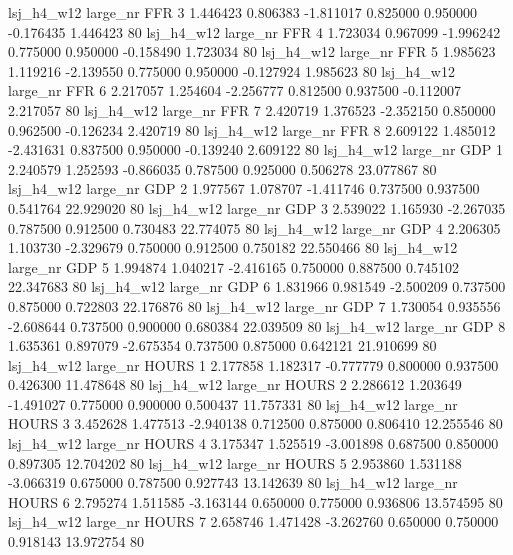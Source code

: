   lsj_h4_w12   large_nr      FFR                 3  1.446423  0.806383  -1.811017 0.825000 0.950000 -0.176435    1.446423 80
  lsj_h4_w12   large_nr      FFR                 4  1.723034  0.967099  -1.996242 0.775000 0.950000 -0.158490    1.723034 80
  lsj_h4_w12   large_nr      FFR                 5  1.985623  1.119216  -2.139550 0.775000 0.950000 -0.127924    1.985623 80
  lsj_h4_w12   large_nr      FFR                 6  2.217057  1.254604  -2.256777 0.812500 0.937500 -0.112007    2.217057 80
  lsj_h4_w12   large_nr      FFR                 7  2.420719  1.376523  -2.352150 0.850000 0.962500 -0.126234    2.420719 80
  lsj_h4_w12   large_nr      FFR                 8  2.609122  1.485012  -2.431631 0.837500 0.950000 -0.139240    2.609122 80
  lsj_h4_w12   large_nr      GDP                 1  2.240579  1.252593  -0.866035 0.787500 0.925000  0.506278   23.077867 80
  lsj_h4_w12   large_nr      GDP                 2  1.977567  1.078707  -1.411746 0.737500 0.937500  0.541764   22.929020 80
  lsj_h4_w12   large_nr      GDP                 3  2.539022  1.165930  -2.267035 0.787500 0.912500  0.730483   22.774075 80
  lsj_h4_w12   large_nr      GDP                 4  2.206305  1.103730  -2.329679 0.750000 0.912500  0.750182   22.550466 80
  lsj_h4_w12   large_nr      GDP                 5  1.994874  1.040217  -2.416165 0.750000 0.887500  0.745102   22.347683 80
  lsj_h4_w12   large_nr      GDP                 6  1.831966  0.981549  -2.500209 0.737500 0.875000  0.722803   22.176876 80
  lsj_h4_w12   large_nr      GDP                 7  1.730054  0.935556  -2.608644 0.737500 0.900000  0.680384   22.039509 80
  lsj_h4_w12   large_nr      GDP                 8  1.635361  0.897079  -2.675354 0.737500 0.875000  0.642121   21.910699 80
  lsj_h4_w12   large_nr    HOURS                 1  2.177858  1.182317  -0.777779 0.800000 0.937500  0.426300   11.478648 80
  lsj_h4_w12   large_nr    HOURS                 2  2.286612  1.203649  -1.491027 0.775000 0.900000  0.500437   11.757331 80
  lsj_h4_w12   large_nr    HOURS                 3  3.452628  1.477513  -2.940138 0.712500 0.875000  0.806410   12.255546 80
  lsj_h4_w12   large_nr    HOURS                 4  3.175347  1.525519  -3.001898 0.687500 0.850000  0.897305   12.704202 80
  lsj_h4_w12   large_nr    HOURS                 5  2.953860  1.531188  -3.066319 0.675000 0.787500  0.927743   13.142639 80
  lsj_h4_w12   large_nr    HOURS                 6  2.795274  1.511585  -3.163144 0.650000 0.775000  0.936806   13.574595 80
  lsj_h4_w12   large_nr    HOURS                 7  2.658746  1.471428  -3.262760 0.650000 0.750000  0.918143   13.972754 80
